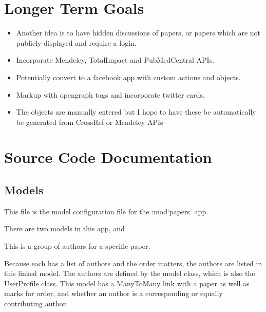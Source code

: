 \documentclass[letterpaper,10pt,english]{sphinxmanual}
\begin{document}
\section{Longer Term Goals}
\label{papers:longer-term-goals}\begin{itemize}
\item {} 
Another idea is to have hidden discussions of papers, or papers which are not publicly displayed and require a login.

\item {} 
Incorporate Mendeley, TotalImpact and PubMedCentral APIs.

\item {} 
Potentially convert to a facebook app with custom actions and objects.

\item {} 
Markup with opengraph tags and incorporate twitter cards.

\item {} 
The {\hyperref[papers:papers.models.Publication]{}} objects are manually entered but I hope to have these be automatically be generated from CrossRef or Mendeley APIs

\end{itemize}


\section{Source Code Documentation}
\label{papers:source-code-documentation}

\subsection{Models}
\label{papers:module-papers.models}\label{papers:models}
This file is the model configuration file for the :mod{}`papers{}` app.

There are two models in this app, {\hyperref[papers:papers.models.Publication]{}} and {\hyperref[papers:papers.models.AuthorDetails]{}}

\begin{fulllineitems}
\label{papers:papers.models.AuthorDetails}
This is a group of authors for a specific paper.

Because each {\hyperref[papers:papers.models.Publication]{}} has a list of authors and the order matters, the authors are listed in this linked model.
The authors are defined by the  model class, which is also the UserProfile class.
This model has a ManyToMany link with a paper as well as marks for order, and whether an author is a corresponding or equally contributing author.

\end{fulllineitems}
\end{document}
